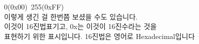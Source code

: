\documentclass[preview]{standalone}
\begin{document}
\begin{center}
0(0x00)~255(0xFF)\\이렇게 생긴 걸 한번쯤 보셨을 수도 있습니다.\\이것이 16진법표기고, 0x는 이것이 16진수라는 것을\\표현하기 위한 표시입니다. 16진법은 영어로 Hexadecimal입니다
\end{center}
\end{document}
